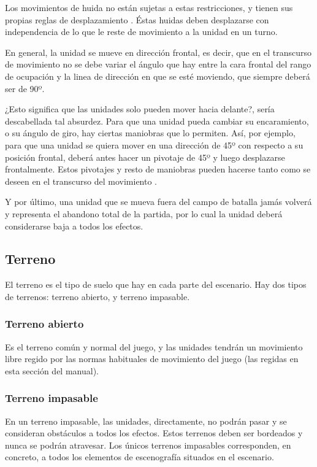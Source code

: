 Los movimientos de huida no están sujetas a estas restricciones, y
tienen sus propias reglas de desplazamiento . Éstas huidas deben
desplazarse con independencia de lo que le reste de movimiento a la
unidad en un turno.

En general, la unidad se mueve en dirección frontal, es decir, que en
el transcurso de movimiento no se debe variar el ángulo que hay entre
la cara frontal del rango de ocupación y la linea de dirección en que
se esté moviendo, que siempre deberá ser de 90º.

¿Esto significa que las unidades solo pueden mover hacia delante?,
sería descabellada tal absurdez. Para que una unidad pueda cambiar su
encaramiento, o su ángulo de giro, hay ciertas maniobras que lo
permiten. Así, por ejemplo, para que una unidad se quiera mover en una
dirección de 45º con respecto a su posición frontal, deberá antes
hacer un pivotaje de 45º y luego desplazarse frontalmente. Estos
pivotajes y resto de maniobras pueden hacerse tanto como se deseen en
el transcurso del movimiento .

Y por último, una unidad que se mueva fuera del campo de batalla jamás
volverá y representa el abandono total de la partida, por lo cual la
unidad deberá considerarse baja a todos los efectos.

\subsection*{Terreno}
El terreno es el tipo de suelo que hay en cada parte del escenario. Hay dos tipos de terrenos: terreno abierto, y terreno impasable.

\subsubsection*{Terreno abierto}
Es el terreno común y normal del juego, y las unidades tendrán un movimiento libre regido por las normas habituales de movimiento del juego (las regidas en esta sección del manual).

\subsubsection*{Terreno impasable}
En un terreno impasable, las unidades, directamente, no podrán pasar y
se consideran obstáculos a todos los efectos. Estos terrenos deben ser
bordeados y nunca se podrán atravesar. Los únicos terrenos impasables
corresponden, en concreto, a todos los elementos de escenografía
situados en el escenario.


